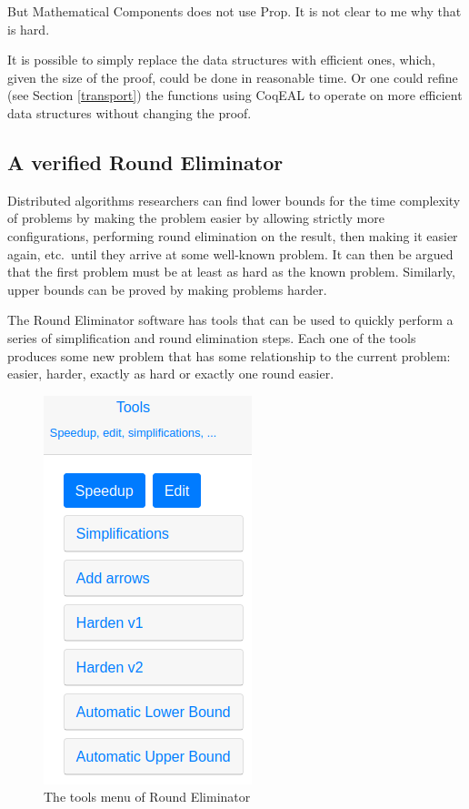 \documentclass[english, 12pt, a4paper, sci, a-1b, online]{aaltothesis}
\begin{document}
But Mathematical Components does not use Prop. It is not clear to me why that is hard.

It is possible to simply replace the data structures with efficient ones, which, given the size of the proof, could be done in reasonable time. Or one could refine (see Section \ref{transport}) the functions using CoqEAL to operate on more efficient data structures without changing the proof.

\subsection{A verified Round Eliminator}

Distributed algorithms researchers can find lower bounds for the time complexity of problems by making the problem easier by allowing strictly more configurations, performing round elimination on the result, then making it easier again, etc.\ until they arrive at some well-known problem. It can then be argued that the first problem must be at least as hard as the known problem. Similarly, upper bounds can be proved by making problems harder.

The Round Eliminator software has tools that can be used to quickly perform a series of simplification and round elimination steps. Each one of the tools produces some new problem that has some relationship to the current problem: easier, harder, exactly as hard or exactly one round easier.

\begin{figure}[h]
  \centering
  \includegraphics[scale=0.5]{retools}
  \caption{The tools menu of Round Eliminator}
\end{figure}
\end{document}
